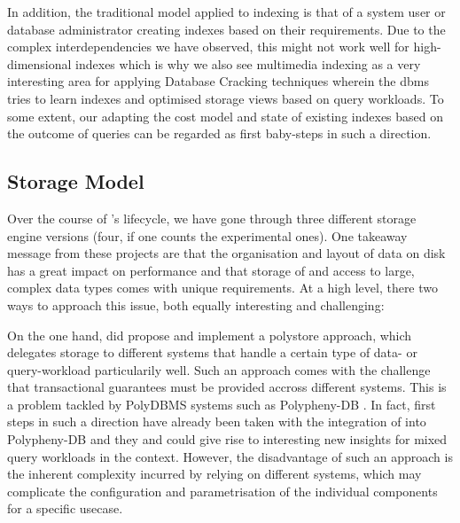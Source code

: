 In addition, the traditional model applied to indexing is that of a system user or database administrator creating indexes based on their requirements. Due to the complex interdependencies we have observed, this might not work well for high-dimensional indexes which is why we also see multimedia indexing as a very interesting area for applying Database Cracking techniques \cite{Idreos:2007Database,Schuhknecht:2013Uncracked} wherein the \acrshort{dbms} tries to learn indexes and optimised storage views based on query workloads. To some extent, our adapting the cost model and state of existing indexes based on the outcome of queries can be regarded as first baby-steps in such a direction.

\subsection{Storage Model}
Over the course of \cottontail{}'s lifecycle, we have gone through three different storage engine versions (four, if one counts the experimental ones). One takeaway message from these projects are that the organisation and layout of data on disk has a great impact on performance and that storage of and access to large, complex data types comes with unique requirements. At a high level, there two ways to approach this issue, both equally interesting and challenging:

On the one hand, \cite{Giangreco:2018Database} did propose and implement a polystore approach, which delegates storage to different systems that handle a certain type of data- or query-workload particularily well. Such an approach comes with the challenge that transactional guarantees must be provided accross different systems. This is a problem tackled by PolyDBMS systems such as Polypheny-DB \cite{Vogt:2018Polypheny,Vogt:2020Polypheny}. In fact, first steps in such a direction have already been taken with the integration of \cottontail{} into Polypheny-DB and they and could give rise to interesting new insights for mixed query workloads in the \vitrivr{}  context. However, the disadvantage of such an approach is the inherent complexity incurred by relying on different systems, which may complicate the configuration and parametrisation of the individual components for a specific usecase.

